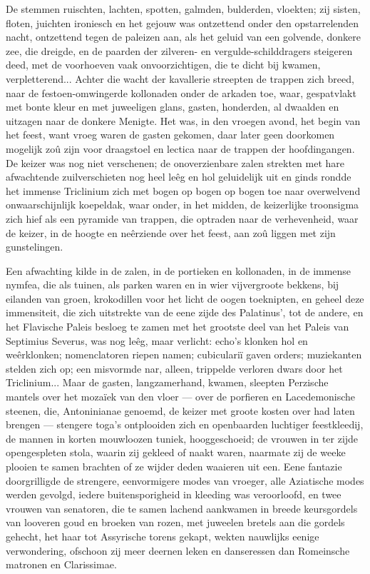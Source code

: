 \documentclass[a4paper, 12pt, oneside, dutch]{article}
\begin{document}
De stemmen ruischten, lachten, spotten, galmden, bulderden, vloekten; zij sisten, floten, juichten ironiesch en het gejouw was ontzettend onder den opstarrelenden nacht, ontzettend tegen de paleizen aan, als het geluid van een golvende, donkere zee, die dreigde, en de paarden der zilveren- en vergulde-schilddragers steigeren deed, met de voorhoeven vaak onvoorzichtigen, die te dicht bij kwamen, verpletterend... Achter die wacht der kavallerie streepten de trappen zich breed, naar de festoen-omwingerde kollonaden onder de arkaden toe, waar, gespatvlakt met bonte kleur en met juweeligen glans, gasten, honderden, al dwaalden en uitzagen naar de donkere Menigte. Het was, in den vroegen avond, het begin van het feest, want vroeg waren de gasten gekomen, daar later geen doorkomen mogelijk zoû zijn voor draagstoel en lectica naar de trappen der hoofdingangen. De keizer was nog niet verschenen; de onoverzienbare zalen strekten met hare afwachtende zuilverschieten nog heel leêg en hol geluidelijk uit en ginds rondde het immense Triclinium zich met bogen op bogen op bogen toe naar overwelvend onwaarschijnlijk koepeldak, waar onder, in het midden, de keizerlijke troonsigma zich hief als een pyramide van trappen, die optraden naar de verhevenheid, waar de keizer, in de hoogte en neêrziende over het feest, aan zoû liggen met zijn gunstelingen.

Een afwachting kilde in de zalen, in de portieken en kollonaden, in de immense nymfea, die als tuinen, als parken waren en in wier vijvergroote bekkens, bij eilanden van groen, krokodillen voor het licht de oogen toeknipten, en geheel deze immensiteit, die zich uitstrekte van de eene zijde des Palatinus', tot de andere, en het Flavische Paleis besloeg te zamen met het grootste deel van het Paleis van Septimius Severus, was nog leêg, maar verlicht: echo's klonken hol en weêrklonken; nomenclatoren riepen namen; cubiculariï gaven orders; muziekanten stelden zich op; een misvormde nar, alleen, trippelde verloren dwars door het Triclinium... Maar de gasten, langzamerhand, kwamen, sleepten Perzische mantels over het mozaïek van den vloer --- over de porfieren en Lacedemonische steenen, die, Antoninianae genoemd, de keizer met groote kosten over had laten brengen --- stengere toga's ontplooiden zich en openbaarden luchtiger feestkleedij, de mannen in korten mouwloozen tuniek, hooggeschoeid; de vrouwen in ter zijde opengespleten stola, waarin zij gekleed of naakt waren, naarmate zij de weeke plooien te samen brachten of ze wijder deden waaieren uit een. Eene fantazie doorgrilligde de strengere, eenvormigere modes van vroeger, alle Aziatische modes werden gevolgd, iedere buitensporigheid in kleeding was veroorloofd, en twee vrouwen van senatoren, die te samen lachend aankwamen in breede keursgordels van looveren goud en broeken van rozen, met juweelen bretels aan die gordels gehecht, het haar tot Assyrische torens gekapt, wekten nauwlijks eenige verwondering, ofschoon zij meer deernen leken en danseressen dan Romeinsche matronen en Clarissimae.
\end{document}
